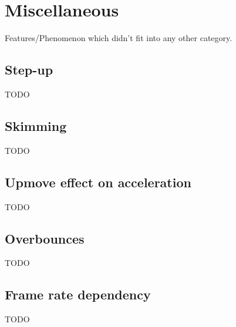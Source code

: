 \section{Miscellaneous}
\label{sec:misc}
Features/Phenomenon which didn't fit into any other category.

\subsection{Step-up}
\label{sec:stepup}
TODO

\subsection{Skimming}
\label{sec:skimming}
TODO

\subsection{Upmove effect on acceleration}
\label{sec:upmove}
TODO

\subsection{Overbounces}
\label{sec:overbounce}
TODO

\subsection{Frame rate dependency}
\label{sec:framerate}
TODO
